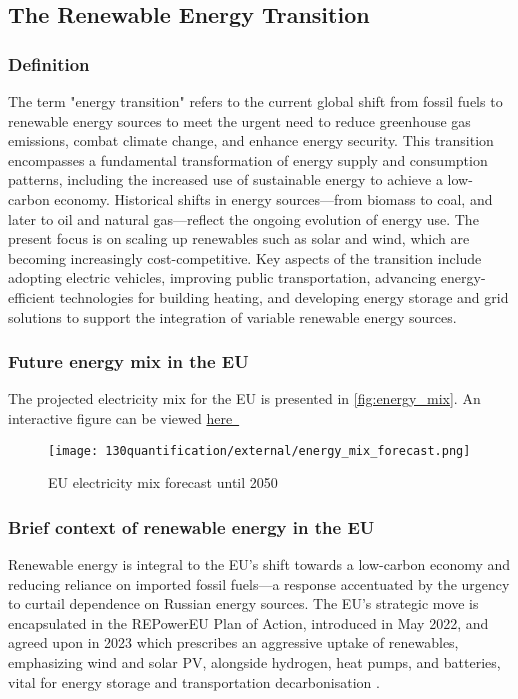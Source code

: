 \subsection{The Renewable Energy Transition}\label{sec:external-energy_transition}


\subsubsection{Definition}

The term "energy transition" refers to the current global shift from fossil fuels to renewable energy sources to meet the urgent need to reduce greenhouse gas emissions, combat climate change, and enhance energy security. This transition encompasses a fundamental transformation of energy supply and consumption patterns, including the increased use of sustainable energy to achieve a low-carbon economy. Historical shifts in energy sources—from biomass to coal, and later to oil and natural gas—reflect the ongoing evolution of energy use. The present focus is on scaling up renewables such as solar and wind, which are becoming increasingly cost-competitive. Key aspects of the transition include adopting electric vehicles, improving public transportation, advancing energy-efficient technologies for building heating, and developing energy storage and grid solutions to support the integration of variable renewable energy sources.

\subsubsection{Future energy mix in the EU}

The projected electricity mix for the EU is presented in \autoref{fig:energy_mix}. An interactive figure can be viewed \href{https://futuram-project.github.io/FutuRaM.github.io/WP2/assets.html}{here~\faLink}

\begin{figure}[h!]
    \centering
    \texttt{[image: 130quantification/external/energy\_mix\_forecast.png]}
    \caption{EU electricity mix forecast until 2050}\label{fig:energy_mix}
\end{figure}

\subsubsection{Brief context of renewable energy in the EU}

Renewable energy is integral to the EU's shift towards a low-carbon economy and reducing reliance on imported fossil fuels—a response accentuated by the urgency to curtail dependence on Russian energy sources. The EU's strategic move is encapsulated in the REPowerEU Plan of Action, introduced in May 2022, and agreed upon in 2023 which prescribes an aggressive uptake of renewables, emphasizing wind and solar PV, alongside hydrogen, heat pumps, and batteries, vital for energy storage and transportation decarbonisation \cite{jrc2023supplychain,eu2023energy,eu2022repower, jrc2022energyclimateoutlook}.


